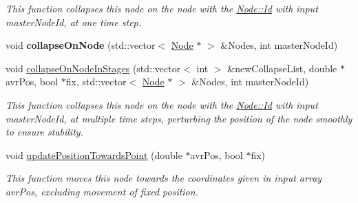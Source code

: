 \begin{DoxyCompactItemize}
\begin{DoxyCompactList}\small\item\em This function collapses this node on the node with the \hyperlink{classNode_a1bd379569cc1a8b96432e61971aed4d9}{Node\+::\+Id} with input master\+Node\+Id, at one time step. \end{DoxyCompactList}\item 
\hypertarget{classNode_af15e6e7d10efc3543d387d2240f938af}{}void {\bfseries collapse\+On\+Node} (std\+::vector$<$ \hyperlink{classNode}{Node} $\ast$ $>$ \&Nodes, int master\+Node\+Id)\label{classNode_af15e6e7d10efc3543d387d2240f938af}

\item 
\hypertarget{classNode_ab33f36d9f71182f47581584be84e1e14}{}void \hyperlink{classNode_ab33f36d9f71182f47581584be84e1e14}{collapse\+On\+Node\+In\+Stages} (std\+::vector$<$ int $>$ \&new\+Collapse\+List, double $\ast$avr\+Pos, bool $\ast$fix, std\+::vector$<$ \hyperlink{classNode}{Node} $\ast$ $>$ \&Nodes, int master\+Node\+Id)\label{classNode_ab33f36d9f71182f47581584be84e1e14}

\begin{DoxyCompactList}\small\item\em This function collapses this node on the node with the \hyperlink{classNode_a1bd379569cc1a8b96432e61971aed4d9}{Node\+::\+Id} with input master\+Node\+Id, at multiple time steps, perturbing the position of the node smoothly to ensure stability. \end{DoxyCompactList}\item 
\hypertarget{classNode_ae7e743eb067730a476ad2b8b27a6b137}{}void \hyperlink{classNode_ae7e743eb067730a476ad2b8b27a6b137}{update\+Position\+Towards\+Point} (double $\ast$avr\+Pos, bool $\ast$fix)\label{classNode_ae7e743eb067730a476ad2b8b27a6b137}

\begin{DoxyCompactList}\small\item\em This function moves this node towards the coordinates given in input array avr\+Pos, excluding movement of fixed position. \end{DoxyCompactList}\end{DoxyCompactItemize}
